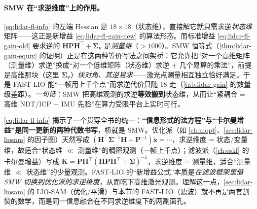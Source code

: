 \paragraph{SMW 在“求逆维度”上的作用。}
\cref{eq:lidar-fl-info} 的左端 Hessian 是 $18\times18$（状态维），直接解它就只需求逆\emph{状态维}矩阵——这正是新增益 \cref{eq:lidar-fl-gain-new} 的算法形态。而标准增益 \cref{eq:lidar-fl-gain-old} 要求逆的 $\mathbf{H}\mathbf{P}\mathbf{H}^\top+\boldsymbol\Sigma_{\mathbf{v}}$ 是\emph{测量维}（$>1000$）。SMW 恒等式（\cref{thm:lidar-gain-equiv} 的证明）正是在这两种等价写法之间架桥：它允许把“对一个高维矩阵（测量维）求逆”换成“对一个低维矩阵（状态维）求逆 + 几个易算的乘法”，前提是高维那块（这里 $\boldsymbol\Sigma_{\mathbf{v}}$）\emph{块对角、其逆易求}——激光点测量相互独立恰好满足。于是 FAST-LIO 能“一帧用上千个点”而求逆代价只随 $18$ 走（\cref{tab:lidar-gain} 的数量级差距）。\emph{一句话}：SMW 把高维观测的求逆\textbf{等效搬到}状态维，从而让“紧耦合 = 高维 NDT/ICP + IMU 先验”在算力受限平台上实时可行。

\begin{insight}[同一恒等式的两副面孔：滤波 vs 优化]\label{ins:lidar-smw}
\cref{eq:lidar-fl-info} 揭示了一个贯穿全书的统一：\textbf{“信息形式的法方程”与“卡尔曼增益”是同一更新的两种代数书写}，桥就是 SMW。优化派（如 \cref{ch:nlopt}、\cref{sec:lidar-liosam} 的因子图）天然写成 $(\mathbf{H}^\top\boldsymbol\Sigma^{-1}\mathbf{H}+\mathbf{P}^{-1})\tilde{\mathbf{x}}=\cdots$，求逆维度 = 状态/变量维，故适合“状态维 $\ll$ 测量维”的稠密观测（一帧上千点）；滤波派（\cref{ch:eskf} 的卡尔曼增益）写成 $\mathbf{K}=\mathbf{P}\mathbf{H}^\top(\mathbf{H}\mathbf{P}\mathbf{H}^\top+\boldsymbol\Sigma)^{-1}$，求逆维度 = 测量维，适合“测量维 $\ll$ 状态维”的少量观测。FAST-LIO 的“新增益公式”本质是\emph{在滤波框架里借 SMW 切换到优化派的求逆维度}，从而吃下高维激光观测。理解这一点，\cref{sec:lidar-liosam} 的 LIO-SAM（优化/平滑）与本节的 FAST-LIO（滤波）就不再是两套割裂的数学，而是同一信息融合在不同求逆维度下的两副面孔。
\end{insight}

